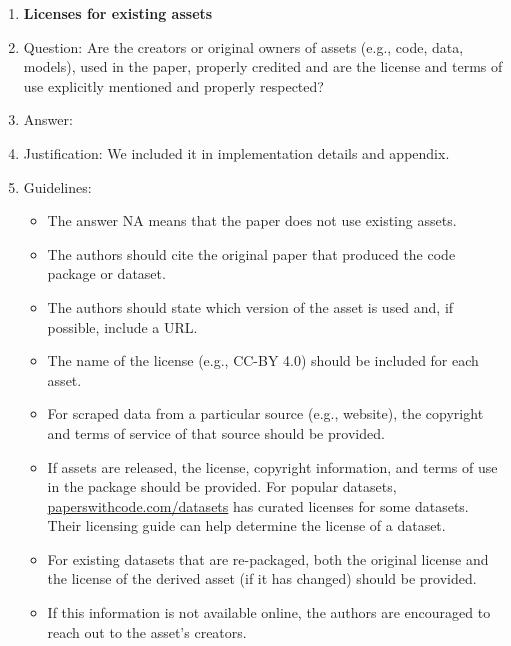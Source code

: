 \documentclass{article}
\begin{document}
\begin{enumerate}
\item {\bf Licenses for existing assets}
    \item[] Question: Are the creators or original owners of assets (e.g., code, data, models), used in the paper, properly credited and are the license and terms of use explicitly mentioned and properly respected?
    \item[] Answer: \answerYes{} %
    \item[] Justification: We included it in implementation details and appendix.
    \item[] Guidelines:
    \begin{itemize}
        \item The answer NA means that the paper does not use existing assets.
        \item The authors should cite the original paper that produced the code package or dataset.
        \item The authors should state which version of the asset is used and, if possible, include a URL.
        \item The name of the license (e.g., CC-BY 4.0) should be included for each asset.
        \item For scraped data from a particular source (e.g., website), the copyright and terms of service of that source should be provided.
        \item If assets are released, the license, copyright information, and terms of use in the package should be provided. For popular datasets, \url{paperswithcode.com/datasets} has curated licenses for some datasets. Their licensing guide can help determine the license of a dataset.
        \item For existing datasets that are re-packaged, both the original license and the license of the derived asset (if it has changed) should be provided.
        \item If this information is not available online, the authors are encouraged to reach out to the asset's creators.
    \end{itemize}


\end{enumerate}
\end{document}
